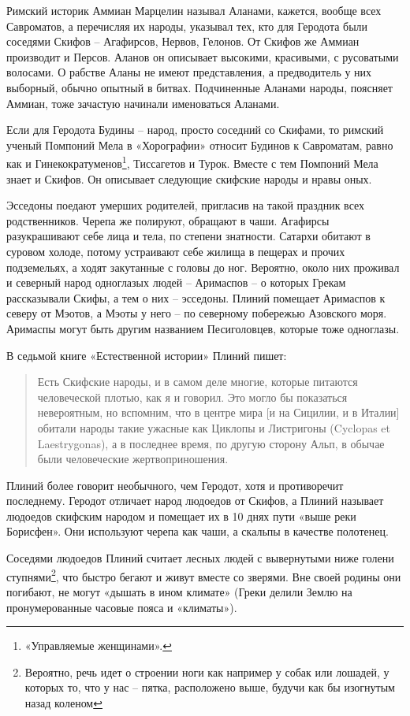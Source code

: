 Римский историк Аммиан Марцелин называл Аланами, кажется, вообще всех Савроматов, а перечисляя их народы, указывал тех, кто для Геродота были соседями Скифов – Агафирсов, Нервов, Гелонов. От Скифов же Аммиан производит и Персов. Аланов он описывает высокими, красивыми, с русоватыми волосами. О рабстве Аланы не имеют представления, а предводитель у них выборный, обычно опытный в битвах. Подчиненные Аланами народы, поясняет Аммиан, тоже зачастую начинали именоваться Аланами.

Если для Геродота Будины – народ, просто соседний со Скифами, то римский ученый Помпоний Мела в «Хорографии» относит Будинов к Савроматам, равно как и Гинекократуменов\footnote{«Управляемые женщинами».}, Тиссагетов и Турок. Вместе с тем Помпоний Мела знает и Скифов. Он описывает следующие скифские народы и нравы оных. 

Эсседоны поедают умерших родителей, пригласив на такой праздник всех родственников. Черепа же полируют, обращают в чаши. Агафирсы разукрашивают себе лица и тела, по степени знатности. Сатархи обитают в суровом холоде, потому устраивают себе жилища в пещерах и прочих подземельях, а ходят закутанные с головы до ног. Вероятно, около них проживал и северный народ одноглазых людей – Аримаспов – о которых Грекам рассказывали Скифы, а тем о них – эсседоны. Плиний помещает Аримаспов к северу от Мэотов, а Мэоты у него – по северному побережью Азовского моря. Аримаспы могут быть другим названием Песиголовцев, которые тоже одноглазы.

В седьмой книге «Естественной истории» Плиний пишет:

\begin{quotation}
Есть Скифские народы, и в самом деле многие, которые питаются человеческой плотью, как я и говорил. Это могло бы показаться невероятным, но вспомним, что в центре мира [и на Сицилии, и в Италии] обитали народы такие ужасные как Циклопы и Листригоны (Cyclopas et Laestrygonas), а в последнее время, по другую сторону Альп, в обычае были человеческие жертвоприношения.
\end{quotation}

Плиний более говорит необычного, чем Геродот, хотя и противоречит последнему. Геродот отличает народ людоедов от Скифов, а Плиний называет людоедов скифским народом и помещает их в 10 днях пути «выше реки Борисфен». Они используют черепа как чаши, а скальпы в качестве полотенец.

Соседями людоедов Плиний считает лесных людей с  вывернутыми ниже голени ступнями\footnote{Вероятно, речь идет о строении ноги как например у собак или лошадей, у которых то, что у нас – пятка, расположено выше, будучи как бы изогнутым назад коленом}, что быстро бегают и живут вместе со зверями. Вне своей родины они погибают, не могут «дышать в ином климате» (Греки делили Землю на пронумерованные часовые пояса и «климаты»).

